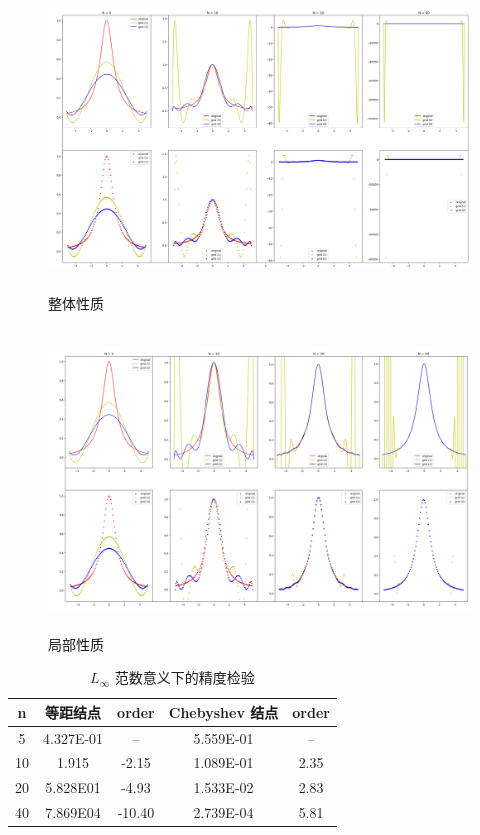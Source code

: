 \documentclass{ctexart}
\begin{document}
\begin{figure}[H]
	\centering
	\includegraphics[width = 15cm, height = 8cm]{figure_1.png}
	\caption{整体性质} \label{figure_1.label}
\end{figure}

\begin{figure}[H]
	\centering
	\includegraphics[width = 15cm, height = 8cm]{figure_2.png}
	\caption{局部性质} \label{figure_2.label}
\end{figure}

\begin{table}[htb]
	\centering
	\bigskip
	\begin{small}
		\begin{tabular}{|c|cc|cc|}
			\hline
			n & 等距结点 & order & Chebyshev 结点 & order\\\hline
			5& 4.327E-01 & -- & 5.559E-01 & -- \\
			10& 1.915 & -2.15 & 1.089E-01 & 2.35\\
			20& 5.828E01 & -4.93 & 1.533E-02 & 2.83 \\
			40& 7.869E04 & -10.40 & 2.739E-04 & 5.81\\\hline
		\end{tabular}
	\end{small}
	\caption{\label{table.label} $L_\infty$ 范数意义下的精度检验} 
\end{table}
\end{document}
